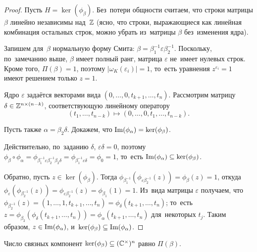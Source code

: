 \documentclass{article}
\begin{document}
\begin{proof}
    Пусть $H = \ker(\phi_\beta)$. Без~потери общности считаем, что строки матрицы $\beta$ линейно независимы над~$\mathbb{Z}$
    (ясно, что строки, выражающиеся как линейная комбинация остальных строк, можно убрать из~матрицы $\beta$ без~изменения ядра).

    Запишем для~$\beta$ нормальную форму Смита: $\beta = \beta_1^{-1} \varepsilon \beta_2^{-1}$.
    Поскольку, по~замечанию выше, $\beta$ имеет полный ранг, матрица $\varepsilon$ не~имеет нулевых строк.
    Кроме того, $\Pi(\beta) = 1$, поэтому $|\omega_K(\varepsilon_i)| = 1$, то~есть уравнения $z^{\varepsilon_i} = 1$
    имеют решением только $z = 1$.

    Ядро $\varepsilon$ задаётся векторами вида $(0, \ldots, 0, t_{k + 1}, \ldots, t_{n})$.
    Рассмотрим матрицу $\delta \in \mathbb{Z}^{n \times (n - k)}$, соответствующую линейному оператору
    $$
        (t_1, \ldots, t_{n - k}) \mapsto (0, \ldots, 0, t_1, \ldots, t_{n - k}).
    $$

    Пусть также $\alpha = \beta_2 \delta$. Докажем, что $\mathrm{Im}(\phi_\alpha) = \ker(\phi_\beta)$.

    Действительно, по~заданию $\delta$, $\varepsilon \delta = 0$, поэтому 
    $\phi_{\beta} \circ \phi_{\alpha} = \phi_{\beta_1^{-1} \varepsilon \beta_2^{-1} \beta_2 \delta} = \phi_{\beta_1^{-1} \varepsilon \delta} = \phi_{0} = 1$,
    то~есть $\mathrm{Im}(\phi_{\alpha}) \subseteq \ker(\phi_{\beta})$.

    Обратно, пусть $z \in \ker(\phi_\beta)$. Тогда $\phi_{\beta_1^{-1}} (\phi_{\varepsilon \beta_2^{-1}}(z)) = \phi_\beta(z) = 1$,
    откуда $\phi_{\varepsilon}(\phi_{\beta_2^{-1}}(z)) = \phi_{\varepsilon \beta_2^{-1}}(z) = \phi_{\beta_1}(1) = 1$.
    Из~вида матрицы $\varepsilon$ получаем, что $\phi_{\beta_2^{-1}}(z) = (1, \ldots, 1, t_{k + 1}, \ldots, t_n) = \phi_\delta(t_{k + 1}, \ldots, t_n)$;
    то~есть $z = \phi_{\beta_2}(\phi_\delta(t_{k + 1}, \ldots, t_n)) = \phi_\alpha(t_{k + 1}, \ldots, t_n)$ для~некоторых $t_j$.
    Таким образом, $z \in \mathrm{Im}(\phi_\alpha)$, и~$\ker(\phi_\beta) \subseteq \mathrm{Im}(\phi_\alpha)$.
\end{proof}

\begin{theorem}
\label{theorem:connectedComponentsNumbers}
    Число связных компонент $\ker(\phi_\beta) \subseteq (\mathbb{C}^\times)^n$ равно $\Pi(\beta)$.
\end{theorem}
\end{document}
